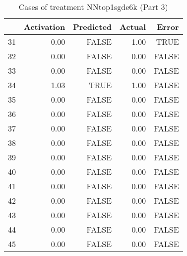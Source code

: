 \begin{table}[ht]
\centering
\begin{tabular}{rrrrr}
  \hline
 & Activation & Predicted & Actual & Error \\ 
  \hline
31 & 0.00 & FALSE & 1.00 & TRUE \\ 
  32 & 0.00 & FALSE & 0.00 & FALSE \\ 
  33 & 0.00 & FALSE & 0.00 & FALSE \\ 
  34 & 1.03 & TRUE & 1.00 & FALSE \\ 
  35 & 0.00 & FALSE & 0.00 & FALSE \\ 
  36 & 0.00 & FALSE & 0.00 & FALSE \\ 
  37 & 0.00 & FALSE & 0.00 & FALSE \\ 
  38 & 0.00 & FALSE & 0.00 & FALSE \\ 
  39 & 0.00 & FALSE & 0.00 & FALSE \\ 
  40 & 0.00 & FALSE & 0.00 & FALSE \\ 
  41 & 0.00 & FALSE & 0.00 & FALSE \\ 
  42 & 0.00 & FALSE & 0.00 & FALSE \\ 
  43 & 0.00 & FALSE & 0.00 & FALSE \\ 
  44 & 0.00 & FALSE & 0.00 & FALSE \\ 
  45 & 0.00 & FALSE & 0.00 & FALSE \\ 
   \hline
\end{tabular}
\caption{Cases of treatment NNtop1sgde6k (Part 3)} 
\end{table}
